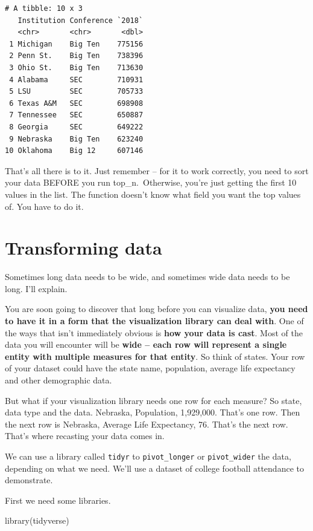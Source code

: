 \documentclass[
  letterpaper,
  DIV=11,
  numbers=noendperiod]{scrreprt}
\newenvironment{Shaded}{\begin{snugshade}}{\end{snugshade}}
\newcommand{\FunctionTok}[1]{\textcolor[rgb]{0.28,0.35,0.67}{#1}}
\newcommand{\NormalTok}[1]{\textcolor[rgb]{0.00,0.23,0.31}{#1}}
\begin{document}
\begin{verbatim}
# A tibble: 10 x 3
   Institution Conference `2018`
   <chr>       <chr>       <dbl>
 1 Michigan    Big Ten    775156
 2 Penn St.    Big Ten    738396
 3 Ohio St.    Big Ten    713630
 4 Alabama     SEC        710931
 5 LSU         SEC        705733
 6 Texas A&M   SEC        698908
 7 Tennessee   SEC        650887
 8 Georgia     SEC        649222
 9 Nebraska    Big Ten    623240
10 Oklahoma    Big 12     607146
\end{verbatim}

That's all there is to it. Just remember -- for it to work correctly,
you need to sort your data BEFORE you run top\_n.~Otherwise, you're just
getting the first 10 values in the list. The function doesn't know what
field you want the top values of. You have to do it.


\hypertarget{transforming-data}{%
\chapter{Transforming data}\label{transforming-data}}

Sometimes long data needs to be wide, and sometimes wide data needs to
be long. I'll explain.

You are soon going to discover that long before you can visualize data,
\textbf{you need to have it in a form that the visualization library can
deal with}. One of the ways that isn't immediately obvious is
\textbf{how your data is cast}. Most of the data you will encounter will
be \textbf{wide -- each row will represent a single entity with multiple
measures for that entity}. So think of states. Your row of your dataset
could have the state name, population, average life expectancy and other
demographic data.

But what if your visualization library needs one row for each measure?
So state, data type and the data. Nebraska, Population, 1,929,000.
That's one row. Then the next row is Nebraska, Average Life Expectancy,
76. That's the next row. That's where recasting your data comes in.

We can use a library called \texttt{tidyr} to \texttt{pivot\_longer} or
\texttt{pivot\_wider} the data, depending on what we need. We'll use a
dataset of college football attendance to demonstrate.

First we need some libraries.

\begin{Shaded}
\begin{Highlighting}[]
\FunctionTok{library}\NormalTok{(tidyverse)}
\end{Highlighting}
\end{Shaded}
\end{document}
